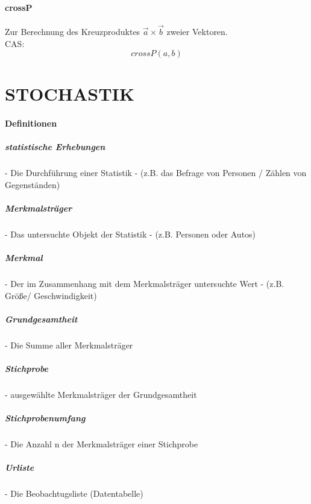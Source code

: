 \documentclass[a4paper,12pt]{article}
\begin{document}
\subsection{crossP}
Zur Berechnung des Kreuzproduktes $\vec{a} \times \vec{b}$ zweier Vektoren.\\
CAS:\\
$$crossP(a,b)$$
\pagebreak
\part{STOCHASTIK}
\subsection{Definitionen}
\subsubsection{statistische Erhebungen}
    - Die Durchführung einer Statistik
    - (z.B. das Befrage von Personen / Zählen von Gegenständen)
    
\subsubsection{Merkmalsträger}
    - Das untersuchte Objekt der Statistik
    - (z.B. Personen oder Autos)
    
\subsubsection{Merkmal}
    - Der im Zusammenhang mit dem Merkmalsträger untersuchte Wert
    - (z.B. Größe/ Geschwindigkeit)
    
\subsubsection{Grundgesamtheit}
    - Die Summe aller Merkmalsträger
    
\subsubsection{Stichprobe}
    - ausgewählte Merkmalsträger der Grundgesamtheit

\subsubsection{Stichprobenumfang}
    - Die Anzahl n der Merkmalsträger einer Stichprobe
    
\subsubsection{Urliste}
    - Die Beobachtugsliste (Datentabelle)
    
\end{document}
